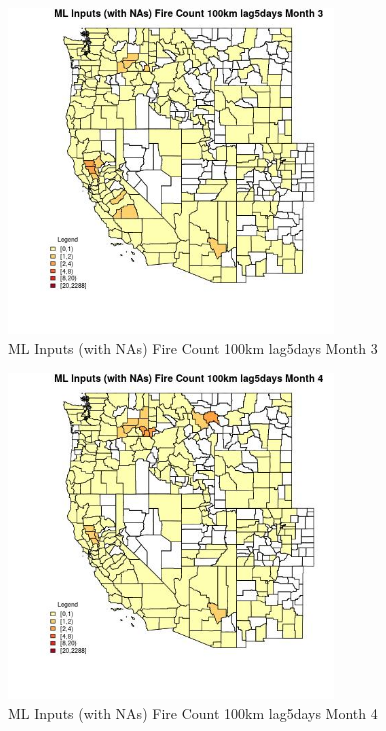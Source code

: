 \begin{figure} 
\centering  
\includegraphics[width=0.77\textwidth]{Code_Outputs/Report_ML_input_PM25_Step4_part_e_de_duplicated_aves_compiled_2019-05-20wNAs_CountyFire_Count_100km_lag5daysmedianMonth3.jpg} 
\caption{\label{fig:Report_ML_input_PM25_Step4_part_e_de_duplicated_aves_compiled_2019-05-20wNAsCountyFire_Count_100km_lag5daysmedianMonth3}ML Inputs (with NAs) Fire Count 100km lag5days Month 3} 
\end{figure} 
 

\begin{figure} 
\centering  
\includegraphics[width=0.77\textwidth]{Code_Outputs/Report_ML_input_PM25_Step4_part_e_de_duplicated_aves_compiled_2019-05-20wNAs_CountyFire_Count_100km_lag5daysmedianMonth4.jpg} 
\caption{\label{fig:Report_ML_input_PM25_Step4_part_e_de_duplicated_aves_compiled_2019-05-20wNAsCountyFire_Count_100km_lag5daysmedianMonth4}ML Inputs (with NAs) Fire Count 100km lag5days Month 4} 
\end{figure} 
 

